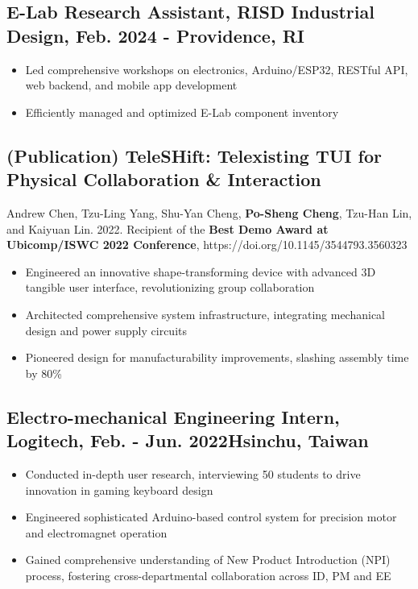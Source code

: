 \documentclass[12pt]{article}
\begin{document}
    \subsection*{E-Lab Research Assistant, RISD Industrial Design, Feb. 2024 -  \hfill Providence, RI}
        { \small
        \begin{itemize}
            \item Led comprehensive workshops on electronics, Arduino/ESP32, RESTful API, web backend, and mobile app development
            \item Efficiently managed and optimized E-Lab component inventory
        \end{itemize}
        }
    \subsection*{(Publication) TeleSHift: Telexisting TUI for Physical Collaboration \& Interaction}
    { \small
    {\scriptsize Andrew Chen, Tzu-Ling Yang, Shu-Yan Cheng, \textbf{Po-Sheng Cheng}, Tzu-Han Lin, and Kaiyuan Lin. 2022. Recipient of the \textbf{Best Demo Award at Ubicomp/ISWC 2022 Conference}, https://doi.org/10.1145/3544793.3560323}
        \begin{itemize}
            \item Engineered an innovative shape-transforming device with advanced 3D tangible user interface, revolutionizing group collaboration
            \item Architected comprehensive system infrastructure, integrating mechanical design and power supply circuits
            \item Pioneered design for manufacturability improvements, slashing assembly time by 80\%
        \end{itemize}
        }
    
        \subsection*{Electro-mechanical Engineering Intern, Logitech, Feb. - Jun. 2022\hfill Hsinchu, Taiwan}
        { \small
        \begin{itemize}
            \item Conducted in-depth user research, interviewing 50 students to drive innovation in gaming keyboard design
            \item Engineered sophisticated Arduino-based control system for precision motor and electromagnet operation
            \item Gained comprehensive understanding of New Product Introduction (NPI) process, fostering cross-departmental collaboration across ID, PM and EE
        \end{itemize}
        }
\end{document}
